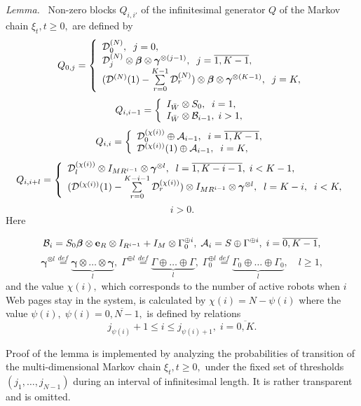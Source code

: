 \documentclass[11pt]{article}
\begin{document}
 {\it Lemma.} ~Non-zero blocks $Q_{i,i'}$ of the infinitesimal generator $Q$ of the Markov chain $\xi_t, t\geq
 0,$ are defined by
$$
Q_{0,j}=\left \{ \begin{array}{lr} {\mathcal D}^{(N)}_0,\;\; j=0,
\cr {\mathcal D}^{(N)}_j\otimes {\boldsymbol \beta} \otimes
{\boldsymbol \gamma}^{\otimes (j-1)}, \;\; j=\overline{1,K-1}, \cr
({\mathcal
 D}^{(N)}(1) - \sum\limits_{r=0}^{K-1} {\mathcal D}^{(N)}_r)\otimes {\boldsymbol \beta} \otimes {\boldsymbol
\gamma}^{\otimes (K-1)}, \;\; j=K, \cr
\end{array} \right.
$$
$$
Q_{i,i-1}=\left \{ \begin{array}{lr} I_{\bar W}\otimes S_0,\;\; i=1,
\cr I_{\bar W}\otimes {\mathcal B}_{i-1}, \; i > 1, \cr
\end{array} \right.
$$
$$
Q_{i,i}=\left \{ \begin{array}{lr} {\mathcal D}^{(\chi(i))}_0 \oplus
{\mathcal A}_{i-1},\;\; i=\overline{1,K-1}, \cr {\mathcal
D}^{(\chi(i))}(1)\oplus {\mathcal A}_{i-1},\;\; i=K, \cr
\end{array} \right.
$$
$$
Q_{i,i+l}=\left \{ \begin{array}{lr} {\mathcal D}^{(\chi(i))}_l
\otimes I_{M R^{i-1}} \otimes{\boldsymbol \gamma}^{\otimes l},\;\;
l=\overline{1,K-i-1},\;  i< K-1, \cr ({\mathcal D}^{(\chi(i))}(1) -
\sum\limits_{r=0}^{K-i-1} {\mathcal D}^{(\chi(i))}_r)\otimes I_{M
R^{i-1}}\otimes {\boldsymbol \gamma}^{\otimes l},\;\;  l=K-i, \;\;i<
K,\cr
\end{array} \right.
$$
$$i  > 0.$$
 Here

$$
{\mathcal B}_i = S_0{\boldsymbol \beta}\otimes {\bf e}_R \otimes
I_{R^{i-1}} +I_M \otimes \Gamma_0^{\oplus i},\; {\mathcal
A}_i=S\oplus \Gamma^{\oplus i},\; i=\overline{0,K-1},
$$
$${\boldsymbol \gamma}^{\otimes
l}\stackrel{def}{=}\underbrace{{\boldsymbol
\gamma}\otimes\ldots\otimes{\boldsymbol \gamma}}_l,\; \Gamma^{\oplus
l}\stackrel{def}{=}\underbrace{\Gamma\oplus\ldots\oplus \Gamma}_l,\;
\Gamma_0^{\oplus
l}\stackrel{def}{=}\underbrace{\Gamma_0\oplus\ldots\oplus
\Gamma_0}_l,\quad l\geq 1,
$$
and the value $\chi(i),$ which corresponds to the number of active
robots when $i$ Web pages stay in the system, is calculated by
$\chi(i)=N-\psi(i)$ where the value $\psi(i),
\;\psi(i)=\overline{0,N-1},$ is defined by relations
$$
j_{\psi(i)}+1 \le i \le j_{\psi(i)+1}, \; i=\overline{0,K}.
$$

 Proof of the lemma is implemented by analyzing the probabilities of
transition of the multi-dimensional Markov chain $\xi_t, t\geq 0,$
under the fixed set of  thresholds $(j_1,\dots,j_{N-1})$ during an
interval of infinitesimal length. It is rather transparent and is
omitted.
\end{document}
